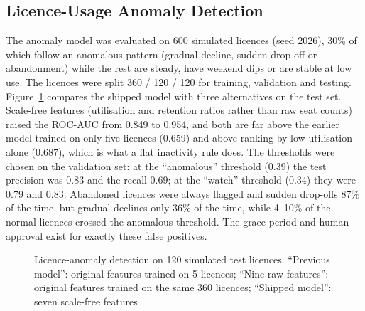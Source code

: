 \subsection{Licence-Usage Anomaly Detection}
The anomaly model was evaluated on 600 simulated licences (seed 2026), 30\% of which follow an anomalous pattern (gradual decline, sudden drop-off or abandonment) while the rest are steady, have weekend dips or are stable at low use. The licences were split 360 / 120 / 120 for training, validation and testing. Figure~\ref{fig:licence} compares the shipped model with three alternatives on the test set. Scale-free features (utilisation and retention ratios rather than raw seat counts) raised the ROC-AUC from 0.849 to 0.954, and both are far above the earlier model trained on only five licences (0.659) and above ranking by low utilisation alone (0.687), which is what a flat inactivity rule does. The thresholds were chosen on the validation set: at the ``anomalous'' threshold (0.39) the test precision was 0.83 and the recall 0.69; at the ``watch'' threshold (0.34) they were 0.79 and 0.83. Abandoned licences were always flagged and sudden drop-offs 87\% of the time, but gradual declines only 36\% of the time, while 4--10\% of the normal licences crossed the anomalous threshold. The grace period and human approval exist for exactly these false positives.

\begin{figure}[H]
\centering
{}
\caption[Licence-anomaly detection on simulated test licences]{Licence-anomaly detection on 120 simulated test licences. ``Previous model'': original features trained on 5 licences; ``Nine raw features'': original features trained on the same 360 licences; ``Shipped model'': seven scale-free features}\label{fig:licence}
\end{figure}

